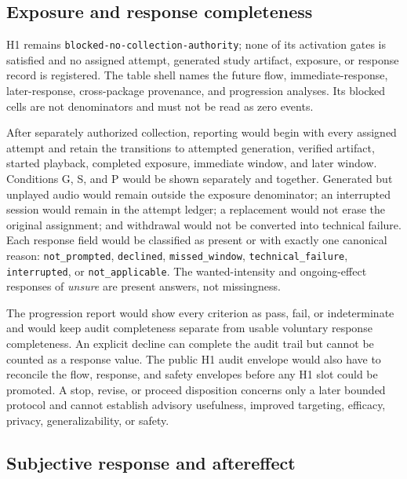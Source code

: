 \subsection{Exposure and response completeness}
\label{sec:results-exposure-completeness}

H1 remains \texttt{blocked-no-collection-authority}; none of its activation
gates is satisfied and no assigned attempt, generated study artifact, exposure,
or response record is registered. The table shell names the future flow,
immediate-response, later-response, cross-package provenance, and progression
analyses. Its blocked cells are not denominators and must not be read as zero
events.

\FloatBarrier

After separately authorized collection, reporting would begin with every
assigned attempt and retain the transitions to attempted generation, verified
artifact, started playback, completed exposure, immediate window, and later
window. Conditions G, S, and P would be shown separately and together. Generated
but unplayed audio would remain outside the exposure denominator; an interrupted
session would remain in the attempt ledger; a replacement would not erase the
original assignment; and withdrawal would not be converted into technical
failure. Each response field would be classified as present or with exactly one
canonical reason: \texttt{not\_prompted}, \texttt{declined},
\texttt{missed\_window}, \texttt{technical\_failure},
\texttt{interrupted}, or \texttt{not\_applicable}. The wanted-intensity and
ongoing-effect responses of \emph{unsure} are present answers, not missingness.

The progression report would show every criterion as pass, fail, or
indeterminate and would keep audit completeness separate from usable voluntary
response completeness. An explicit decline can complete the audit trail but
cannot be counted as a response value. The public H1 audit envelope would also
have to reconcile the flow, response, and safety envelopes before any H1 slot
could be promoted. A stop, revise, or proceed disposition concerns only a later
bounded protocol and cannot establish advisory usefulness, improved targeting,
efficacy, privacy, generalizability, or safety.

\subsection{Subjective response and aftereffect}
\label{sec:results-subjective-response}

